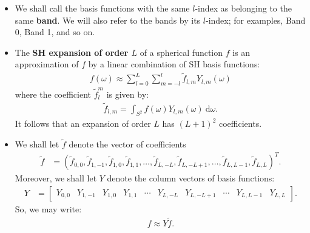 \documentclass[10pt]{article}
\newcommand{\dee}{\mathrm{d}}
\begin{document}
\begin{itemize}
        \item We shall call the basis functions with the same $l$-index as belonging to the same \textbf{band}.  We will also refer to the bands by its $l$-index; for examples, Band 0, Band 1, and so on.

        \item The \textbf{SH expansion of order $L$} of a spherical function $f$ is an approximation of $f$ by a linear combination of SH basis functions:
        \begin{align*}
            f(\omega) \approx \sum_{l=0}^L \sum_{m=-l}^l \tilde{f}_{l,m} Y_{l,m}(\omega)
        \end{align*}
        where the coefficient $\tilde{f}^m_l$ is given by:
        \begin{align*}
            \tilde{f}_{l,m} = \int_{S^2} f(\omega) Y_{l,m}(\omega)\ \dee\omega.
        \end{align*}
        It follows that an expansion of order $L$ has $(L+1)^2$ coefficients.        
        
        \item We shall let $\tilde{f}$ denote the vector of coefficients 
        \begin{align*}
            \tilde{f} &= (\tilde{f}_{0,0}, \tilde{f}_{1,-1}, \tilde{f}_{1,0}, \tilde{f}_{1,1}, \dotsc, \tilde{f}_{L,-L}, \tilde{f}_{L,-L+1}, \dotsc, \tilde{f}_{L,L-1}, \tilde{f}_{L,L} )^T.
        \end{align*}
        Moreover, we shall let $Y$ denote the column vectors of basis functions:
        \begin{align*}
            Y &= \begin{bmatrix}
                Y_{0,0} & Y_{1,-1} & Y_{1,0} & Y_{1,1} & \cdots & Y_{L,-L} & Y_{L,-L+1} & \cdots & Y_{L,L-1} & Y_{L,L}
            \end{bmatrix}.
        \end{align*}
        So, we may write:
        \begin{align*}
            f \approx Y \tilde{f}.
        \end{align*}


\end{itemize}
\end{document}
